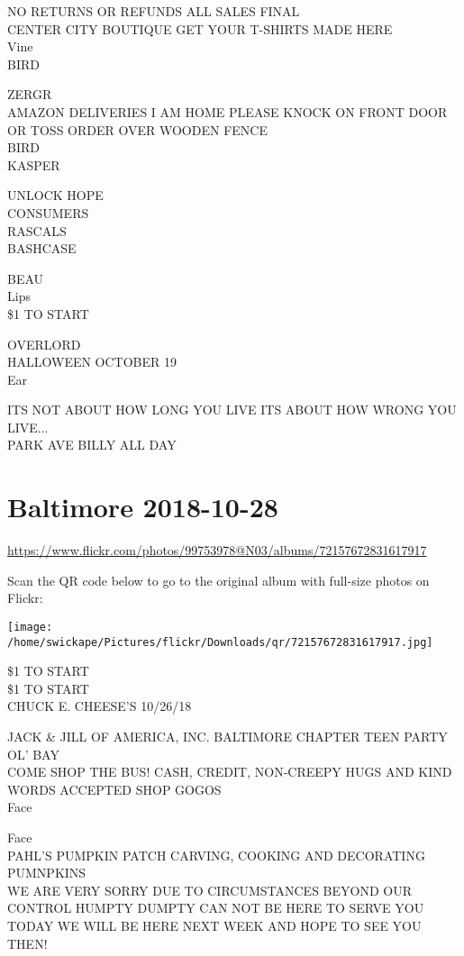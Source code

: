 \documentclass[10pt,letterpaper]{article}
\begin{document}
NO RETURNS OR REFUNDS ALL SALES FINAL\\
CENTER CITY BOUTIQUE GET YOUR T{-}SHIRTS MADE HERE\\
Vine\\
BIRD

ZERGR\\
AMAZON DELIVERIES I AM HOME PLEASE KNOCK ON FRONT DOOR OR TOSS ORDER OVER WOODEN FENCE\\
BIRD\\
KASPER

UNLOCK HOPE\\
CONSUMERS\\
RASCALS\\
BASHCASE

BEAU\\
Lips\\
\$1 TO START

OVERLORD\\
HALLOWEEN OCTOBER 19\\
Ear

ITS NOT ABOUT HOW LONG YOU LIVE ITS ABOUT HOW WRONG YOU LIVE...\\
PARK AVE BILLY ALL DAY
\pagebreak

\section*{Baltimore 2018-10-28}

\url{https://www.flickr.com/photos/99753978@N03/albums/72157672831617917}

Scan the QR code below to go to the original album with full-size photos on Flickr:

\texttt{[image: /home/swickape/Pictures/flickr/Downloads/qr/72157672831617917.jpg]}
\pagebreak

\$1 TO START\\
\$1 TO START\\
CHUCK E. CHEESE'S 10/26/18

JACK \& JILL OF AMERICA, INC. BALTIMORE CHAPTER TEEN PARTY\\
OL' BAY\\
COME SHOP THE BUS!  CASH, CREDIT, NON{-}CREEPY HUGS AND KIND WORDS ACCEPTED SHOP GOGOS\\
Face

Face\\
PAHL'S PUMPKIN PATCH CARVING, COOKING AND DECORATING PUMNPKINS\\
WE ARE VERY SORRY DUE TO CIRCUMSTANCES BEYOND OUR CONTROL HUMPTY DUMPTY CAN NOT BE HERE TO SERVE YOU TODAY WE WILL BE HERE NEXT WEEK AND HOPE TO SEE YOU THEN!
\end{document}
